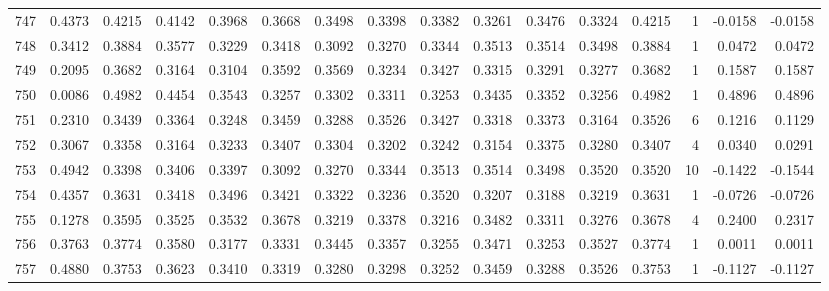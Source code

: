 \begin{tabular}{lrrrrrrrrrrrrrrr}
747 &      0.4373 &  0.4215 &  0.4142 &  0.3968 &  0.3668 &  0.3498 &  0.3398 &  0.3382 &  0.3261 &  0.3476 &   0.3324 &     0.4215 &      1 &                   -0.0158 &                    -0.0158 \\
748 &      0.3412 &  0.3884 &  0.3577 &  0.3229 &  0.3418 &  0.3092 &  0.3270 &  0.3344 &  0.3513 &  0.3514 &   0.3498 &     0.3884 &      1 &                    0.0472 &                     0.0472 \\
749 &      0.2095 &  0.3682 &  0.3164 &  0.3104 &  0.3592 &  0.3569 &  0.3234 &  0.3427 &  0.3315 &  0.3291 &   0.3277 &     0.3682 &      1 &                    0.1587 &                     0.1587 \\
750 &      0.0086 &  0.4982 &  0.4454 &  0.3543 &  0.3257 &  0.3302 &  0.3311 &  0.3253 &  0.3435 &  0.3352 &   0.3256 &     0.4982 &      1 &                    0.4896 &                     0.4896 \\
751 &      0.2310 &  0.3439 &  0.3364 &  0.3248 &  0.3459 &  0.3288 &  0.3526 &  0.3427 &  0.3318 &  0.3373 &   0.3164 &     0.3526 &      6 &                    0.1216 &                     0.1129 \\
752 &      0.3067 &  0.3358 &  0.3164 &  0.3233 &  0.3407 &  0.3304 &  0.3202 &  0.3242 &  0.3154 &  0.3375 &   0.3280 &     0.3407 &      4 &                    0.0340 &                     0.0291 \\
753 &      0.4942 &  0.3398 &  0.3406 &  0.3397 &  0.3092 &  0.3270 &  0.3344 &  0.3513 &  0.3514 &  0.3498 &   0.3520 &     0.3520 &     10 &                   -0.1422 &                    -0.1544 \\
754 &      0.4357 &  0.3631 &  0.3418 &  0.3496 &  0.3421 &  0.3322 &  0.3236 &  0.3520 &  0.3207 &  0.3188 &   0.3219 &     0.3631 &      1 &                   -0.0726 &                    -0.0726 \\
755 &      0.1278 &  0.3595 &  0.3525 &  0.3532 &  0.3678 &  0.3219 &  0.3378 &  0.3216 &  0.3482 &  0.3311 &   0.3276 &     0.3678 &      4 &                    0.2400 &                     0.2317 \\
756 &      0.3763 &  0.3774 &  0.3580 &  0.3177 &  0.3331 &  0.3445 &  0.3357 &  0.3255 &  0.3471 &  0.3253 &   0.3527 &     0.3774 &      1 &                    0.0011 &                     0.0011 \\
757 &      0.4880 &  0.3753 &  0.3623 &  0.3410 &  0.3319 &  0.3280 &  0.3298 &  0.3252 &  0.3459 &  0.3288 &   0.3526 &     0.3753 &      1 &                   -0.1127 &                    -0.1127 \\

\end{tabular}
